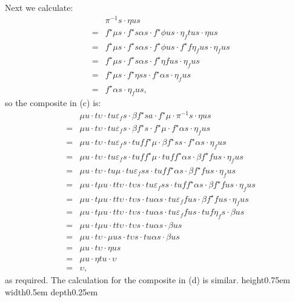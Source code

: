 \documentclass[a4paper,10pt]{article}
\newcommand{\qed}{\nobreak \ifvmode \relax \else
      \ifdim\lastskip<1.5em \hskip-\lastskip
      \hskip1.5em plus0em minus0.5em \fi \nobreak
      \vrule height0.75em width0.5em depth0.25em\fi}
\newenvironment{proof}[1][Proof]{\begin{trivlist}
\item[\hskip \labelsep {\bfseries #1}]}{\end{trivlist}}
\numberwithin{equation}{section}
\begin{document}
\begin{proof}
Next we calculate: 
\begin{eqnarray*}
&& \pi^{-1} s \cdot \eta us \\
& = & f^{\star} \mu s \cdot f^{\star} s \alpha s \cdot f^{\star} \phi us \cdot \eta_f tus \cdot \eta us\\
& = & f^{\star} \mu s \cdot f^{\star} s \alpha s \cdot f^{\star} \phi us \cdot f^{\star} f \eta_f us \cdot \eta_f us \\
& = & f^{\star} \mu s \cdot f^{\star} s \alpha s \cdot f^{\star} \eta fus \cdot \eta_f us \\
& = & f^{\star} \mu s \cdot f^{\star} \eta ss \cdot f^{\star} \alpha s \cdot \eta_f us \\
& = & f^{\star} \alpha s \cdot \eta_f us ,
\end{eqnarray*}
so the composite in (c) is:   
\begin{eqnarray*}
&& \mu u \cdot t \upsilon \cdot tu \varepsilon_f s \cdot \beta f^{\star} sa \cdot f^{\star} \mu \cdot \pi^{-1} s \cdot \eta us \\
& = & \mu u \cdot t \upsilon \cdot tu \varepsilon_f s \cdot \beta f^{\star} s \cdot f^{\star} \mu \cdot f^{\star} \alpha s \cdot \eta_f us \\
& = & \mu u \cdot t \upsilon \cdot tu \varepsilon_f s \cdot tuf f^{\star} \mu \cdot \beta f^{\star} ss \cdot f^{\star} \alpha s \cdot \eta_f us \\
& = & \mu u \cdot t \upsilon \cdot tu \varepsilon_f s \cdot tuf f^{\star} \mu \cdot tuf f^{\star} \alpha s \cdot \beta f^{\star} fus \cdot \eta_f us \\
& = & \mu u \cdot t \upsilon \cdot tu \mu \cdot tu \varepsilon_f ss \cdot tuf f^{\star} \alpha s \cdot \beta f^{\star} fus \cdot \eta_f us \\
& = & \mu u \cdot t \mu u \cdot tt \upsilon \cdot t \upsilon s \cdot tu \varepsilon_f ss \cdot tuf f^{\star} \alpha s \cdot \beta f^{\star} fus \cdot \eta_f us \\
& = & \mu u \cdot t \mu u \cdot tt \upsilon \cdot t \upsilon s \cdot tu \alpha s \cdot tu \varepsilon_f fus \cdot \beta f^{\star} fus \cdot \eta_f us \\
& = & \mu u \cdot t \mu u \cdot tt \upsilon \cdot t \upsilon s \cdot tu \alpha s \cdot tu \varepsilon_f fus \cdot tuf \eta_f s \cdot \beta us \\
& = & \mu u \cdot t \mu u \cdot tt \upsilon \cdot t \upsilon s \cdot tu \alpha s \cdot \beta us \\
& = & \mu u \cdot t \upsilon \cdot \mu us \cdot t \upsilon s \cdot tu \alpha s \cdot \beta us \\
& = & \mu u \cdot t \upsilon \cdot \eta us \\
& = & \mu u \cdot \eta tu \cdot \upsilon \\
& = & \upsilon ,
\end{eqnarray*}   
as required. The calculation for the composite in (d) is similar.   \qed
\end{proof}
\end{document}
